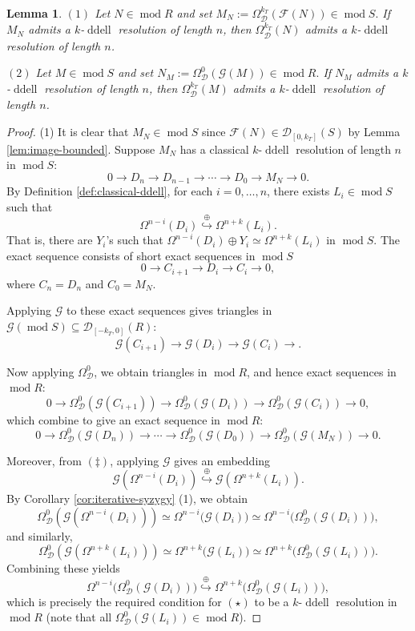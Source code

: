 \documentclass[12pt,a4paper,reqno]{amsart}
\theoremstyle{plain}
\newtheorem{lemma}[theorem]{Lemma}
\theoremstyle{definition}
\theoremstyle{remark}
\DeclareMathOperator{\modd}{mod}
\DeclareMathOperator{\ddell}{ddell}
\newcommand{\D}{\mathcal{D}}
\newcommand{\syz}{\Omega_{\mathcal{D}}}
\newcommand{\oemb}{\stackrel{\oplus}{\hookrightarrow}}
\begin{document}
\begin{lemma} \label{lem:transfer}
$(1)$ Let \(N\in\modd R\) and set $
M_N:=\syz^{k_T}(\mathcal{F}(N))\in\modd S.
$
If \(M_N\) admits a \(k\)-\(\ddell\) resolution of length \(n\), then \(\syz^{k_T}(N)\) admits a \(k\)-\(\ddell\) resolution of length \(n\).

$(2)$ Let \(M\in\modd S\) and set $
N_M:=\syz^{0}(\mathcal{G}(M))\in\modd R.
$
If \(N_M\) admits a \(k\)-\(\ddell\) resolution of length \(n\), then \(\syz^{k_T}(M)\) admits a \(k\)-\(\ddell\) resolution of length \(n\).
\end{lemma}

\begin{proof} (1)
It is clear that $M_N\in\modd S$ since $\mathcal{F}(N)\in\D_{[0,k_T]}(S)$ by Lemma \ref{lem:image-bounded}.
Suppose $M_N$ has a classical $k$-$\ddell$ resolution of length \(n\) in $\modd S$:
\[
0 \longrightarrow D_n \longrightarrow D_{n-1} \longrightarrow \cdots \longrightarrow D_0 \longrightarrow M_N \longrightarrow 0. \tag{$\dagger$}
\]
By Definition \ref{def:classical-ddell}, for each \(i=0,\ldots,n\), there exists \(L_i\in\modd S\) such that
\[
\Omega^{n-i}(D_i) \oemb \Omega^{n+k}(L_i). \tag{$\ddagger$}
\]
That is, there are $Y_i$'s such that $\Omega^{n-i}(D_i)\oplus Y_i\simeq \Omega^{n+k}(L_i)$ in $\modd S$. The exact sequence consists of short exact sequences in $\modd S$ 
\[
    0\to C_{i+1}\to D_i\to C_i\to 0, 
\]
where $C_n=D_n$ and $C_0=M_N$.

Applying $\mathcal{G}$ to these exact sequences gives triangles in $\mathcal{G}(\modd S)\subseteq \D_{[-k_T,0]}(R)$:
 \[
    \mathcal{G}(C_{i+1})\to \mathcal{G}(D_i)\to \mathcal{G}(C_i)\to . 
\]
 
Now applying $\syz^{0}$, we obtain triangles in $\modd R$, and hence exact sequences in $\modd R$:
 \[
    0\to \syz^{0}(\mathcal{G}(C_{i+1}))\to \syz^{0}(\mathcal{G}(D_i))\to \syz^{0}(\mathcal{G}(C_i))\to 0,
\]
which combine to give an exact sequence in $\modd R$:
\[
0 \longrightarrow \syz^{0}(\mathcal{G}(D_n)) \longrightarrow \cdots \longrightarrow \syz^{0}(\mathcal{G}(D_0)) \longrightarrow \syz^{0}(\mathcal{G}(M_N)) \longrightarrow 0. \tag{$\star$}
\]

 Moreover, from \((\ddagger)\), applying $\mathcal{G}$ gives an embedding
\[
\mathcal{G}(\Omega^{n-i}(D_i)) \oemb \mathcal{G}(\Omega^{n+k}(L_i)).
\]
By Corollary \ref{cor:iterative-syzygy} (1), we obtain
\[
\syz^{0}(\mathcal{G}(\Omega^{n-i}(D_i))) \simeq \Omega^{n-i}\bigl(\mathcal{G}(D_i)\bigr) \simeq \Omega^{n-i}\bigl(\syz^{0}(\mathcal{G}(D_i))\bigr),
\]
and similarly,
\[
\syz^{0}(\mathcal{G}(\Omega^{n+k}(L_i))) \simeq \Omega^{n+k}\bigl(\mathcal{G}(L_i)\bigr) \simeq \Omega^{n+k}\bigl(\syz^{0}(\mathcal{G}(L_i))\bigr).
\]
Combining these yields
\[
\Omega^{n-i}\bigl(\syz^{0}(\mathcal{G}(D_i))\bigr) \oemb \Omega^{n+k}\bigl(\syz^{0}(\mathcal{G}(L_i))\bigr),
\]
which is precisely the required condition for \((\star)\) to be a $k$-$\ddell$ resolution in $\modd R$ (note that all $\syz^{0}(\mathcal{G}(L_i))\in \modd R$).


\end{proof}
\end{document}
